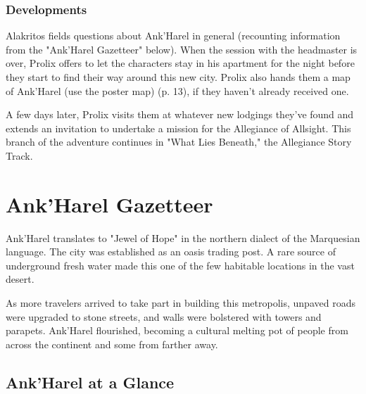 \documentclass[a4paper, 11pt, bg=full, twocolumn, nooutline]{dndbook}
\begin{document}
\subsubsection{Developments}

Alakritos fields questions about Ank'Harel in general (recounting information from the "Ank'Harel Gazetteer" below). When the session with the headmaster is over, Prolix offers to let the characters stay in his apartment for the night before they start to find their way around this new city. Prolix also hands them a map of Ank'Harel (use the poster map) (p. 13), if they haven't already received one.

A few days later, Prolix visits them at whatever new lodgings they've found and extends an invitation to undertake a mission for the Allegiance of Allsight. This branch of the adventure continues in "What Lies Beneath," the Allegiance Story Track.
\section{Ank'Harel Gazetteer}

Ank'Harel translates to "Jewel of Hope" in the northern dialect of the Marquesian language. The city was established as an oasis trading post. A rare source of underground fresh water made this one of the few habitable locations in the vast desert.

As more travelers arrived to take part in building this metropolis, unpaved roads were upgraded to stone streets, and walls were bolstered with towers and parapets. Ank'Harel flourished, becoming a cultural melting pot of people from across the continent and some from farther away.

\subsection{Ank'Harel at a Glance}
\end{document}
